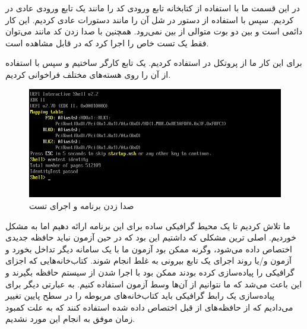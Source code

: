 


در این قسمت ما با استفاده از کتابخانه  تابع ورودی کد را مانند یک تابع ورودی عادی در  کردیم. سپس با استفاده از دستور  در شل آن را مانند دستورات عادی کردیم. این کار دائمی است و بین دو بوت متوالی از بین نمی‌رود. همچنین با صدا زدن کد مانند  می‌توان فقط یک تست خاص را اجرا کرد که در  قابل مشاهده است.


برای این کار ما از پروتکل  در  استفاده کردیم. یک تابع کارگر ساختیم و سپس با استفاده از  آن را روی هسته‌های مختلف فراخوانی کردیم.

\begin{figure}
	\centering
	\includegraphics[width=0.7\linewidth]{figs/impl/impl1}
	\caption{صدا زدن برنامه و اجرای تست }
	\label{fig:impl1}
\end{figure}


ما تلاش کردیم تا یک محیط گرافیکی ساده برای این برنامه ارائه دهیم اما به مشکل خوردیم. اصلی ترین مشکلی که داشتیم این بود که در حین آزمون نباید حافظه جدیدی اختصاص داده می‌شود، وگرنه ممکن بود آزمون ما با یک سامانه دیگر تداخل بخورد و آزمون و/یا روند اجرای یک تابع بیرونی به غلط انجام شوند. کتاب‌خانه‌هایی که اجزای گرافیکی را پیاده‌سازی کرده بودند ممکن بود با اجرا شدن از سیستم حافظه بگیرند و این باعث می‌شد که ما نتوانیم از آن‌ها وسط آزمون استفاده کنیم. به عبارتی دیگر برای پیاده‌سازی یک رابط گرافیکی باید کتاب‌خانه‌های مربوطه را در سطح پایین تغییر می‌دادیم که از حافظه‌های از قبل اختصاص داده شده استفاده کنند که به علت کمبود زمان موفق به انجام این مورد نشدیم.